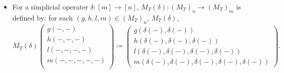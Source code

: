 \documentclass{tac}
\newcommand{\act}[1]{\,\sp{#1}\!}
\newcommand{\del}{\partial}
\begin{document}
\begin{itemize}
\begin{enumerate}[label=(\alph*)]
\begin{align*}
     M'_ji &=\{l_{ikpx}, \act{h_{ipx}(\act{g_{px}}h_{ikp})}\{h_{pqx}, \act{g_{qx}g_{pq}g_{kp}}h_{ijk}\}^{-1} \}_{L,L}^{-1}\\
        M'_jj &=\act{h_{ikx}}\left(\act{\{h_{kpx},\act{g_{px}g_{kp}}h_{ijk} \}^{-1}(\act{h_{kpx}}\{h_{pqx},\act{g_{qx}g_{pq}g_{kp}}h_{ijk} \}^{-1})} \{h_{kpx}, h_{pqx}, \act{g_{qx}g_{pq}g_{kp}}h_{ijk} \}_L^{-1}\right)\\
           M'_jk &=m_{ikpqx}^{-1}\\
           M'_jp &= \act{ \act{(\act{g_{px}}h_{ijk})}l_{kpqx}\{h_{kqx}(\act{g_{qx}}h_{kpq}),\act{g_{qx}g_{pq}g_{kp}}h_{ijk}\}^{-1}l_{kpqx}^{-1}}\{\del l_{kpqx}, h_{kqx}\act{g_{qx}}h_{kpq}, \act{g_{qx}g_{pq}g_{kp}}h_{ijk} \} \\
            &\ \ \ \ \cdot \act{\left(\act{(\act{g_{px}}h_{ijk}) }l_{kpqx}\right)}\left( \act{l_{kpqx}^{-1}}\{l_{kpqx},\{h_{kqx}(\act{g_{qx}}h_{kpq}),\act{g_{qx}g_{pq}g_{kp}}h_{ijkp}  \} \}_{L,L}\cdot \{ \act{g_{kx}}h_{ijk}, l_{kpqx}^{-1}\}_{HL}   \right)
    \end{align*}


 \item For each $i \in [n]$, we have $g_{ii} = e_G$,
        
 \item For each $i \le j$ in $[n]$, we have $h_{iij} = h_{ijj} = e_H$,
        
 \item For each $i \le j \le k$ in $[n]$, we have $l_{iijk} = l_{ijjk} = l_{ijkk} = e_L$.
 
 \item For each $i \le j \le k \le p$ in $[n]$, we have $m_{iijkp} = m_{ijjkp} = m_{ijkkp} = m_{ijkpp}= e_m$.
    \end{enumerate}
    
  Here, we abbreviate $g(i,j)$, $h(i,j,k)$, and $l(i,j,k,m)$ as $g_{ij}$, $h_{ijk}$, and $l_{ijkm}$, respectively.  If you want to understand the reasoning behind equations~(\ref{r2-simplex m})–(\ref{r5-simplex m:eq}), see Appendix~\ref{cocycle} for details.
    
\item For a simplicial operater $\delta : [m] \rightarrow [n]$, $M_T(\delta): (M_T)_n \rightarrow (M_T)_m$ is defined by: for each $(g,h,l,m) \in (M_T)_n$, $M_T(\delta)$,
\[
M_T(\delta)
\begin{pmatrix}
g(-,-)\\
h(-,-,-)\\
l(-,-,-,-)\\
m(-,-,-,-,-)\\
\end{pmatrix}
\coloneqq
\begin{pmatrix}
g(\delta(-),\delta(-))\\
h(\delta(-),\delta(-),\delta(-))\\
l(\delta(-),\delta(-),\delta(-),\delta(-))\\
m(\delta(-),\delta(-),\delta(-),\delta(-),\delta(-))
\end{pmatrix}
.\]
\end{itemize}
\end{document}
